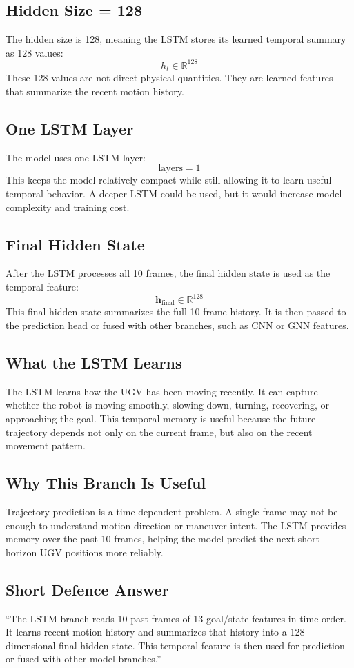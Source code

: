 \documentclass[11pt,a4paper]{article}
\begin{document}
\subsection*{Hidden Size = 128}
The hidden size is 128, meaning the LSTM stores its learned temporal summary as
128 values:
\[
    h_t \in \mathbb{R}^{128}
\]
These 128 values are not direct physical quantities. They are learned features
that summarize the recent motion history.

\subsection*{One LSTM Layer}
The model uses one LSTM layer:
\[
    \text{layers} = 1
\]
This keeps the model relatively compact while still allowing it to learn useful
temporal behavior. A deeper LSTM could be used, but it would increase model
complexity and training cost.

\subsection*{Final Hidden State}
After the LSTM processes all 10 frames, the final hidden state is used as the
temporal feature:
\[
    \mathbf{h}_{\text{final}} \in \mathbb{R}^{128}
\]
This final hidden state summarizes the full 10-frame history. It is then passed
to the prediction head or fused with other branches, such as CNN or GNN
features.

\subsection*{What the LSTM Learns}
The LSTM learns how the UGV has been moving recently. It can capture whether the
robot is moving smoothly, slowing down, turning, recovering, or approaching the
goal. This temporal memory is useful because the future trajectory depends not
only on the current frame, but also on the recent movement pattern.

\subsection*{Why This Branch Is Useful}
Trajectory prediction is a time-dependent problem. A single frame may not be
enough to understand motion direction or maneuver intent. The LSTM provides
memory over the past 10 frames, helping the model predict the next short-horizon
UGV positions more reliably.

\subsection*{Short Defence Answer}
``The LSTM branch reads 10 past frames of 13 goal/state features in time order.
It learns recent motion history and summarizes that history into a 128-dimensional
final hidden state. This temporal feature is then used for prediction or fused
with other model branches.''
\end{document}
